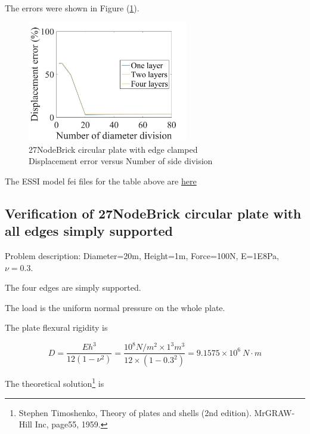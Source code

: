 \documentclass[fleqn,11pt,letter]{article}
\begin{document}
The errors were shown in Figure (\ref{fig 27NodeBrick circular plate with edge clamped}).
\begin{figure}[H]
  \centering
  \includegraphics[width=7cm]{../Figure_files/27NodeBrick/error27brick_circular_plate_clamped100.jpeg}
  \captionsetup{justification=centering,margin=3cm}
  \caption{27NodeBrick circular plate with edge clamped\\
      Displacement error   versus   Number of side division}
  \label{fig 27NodeBrick circular plate with edge clamped}
\end{figure}



The ESSI model fei files for the table above are \href{https://github.com/yuan-energy/ESSI_Verification/blob/master/27NodeBrick/circular_plate_clamped/circular_plate_clamped.tar.gz?raw=true}{here}






\newpage
\subsection{Verification of 27NodeBrick circular plate with all edges simply supported}


Problem description: Diameter=20m, Height=1m, Force=100N, E=1E8Pa, $\nu=0.3$. 

The four edges are simply supported. 

The load is the uniform normal pressure on the whole plate. 


The plate flexural rigidity is 

\begin{equation}
  D=\frac{Eh^3}{12(1-\nu^2)}=\frac{10^8 N/m^2 \times 1^3 m^3 }{12 \times (1-0.3^2) }= 9.1575 \times 10^6 \ N\cdot m
\end{equation}

The theoretical solution\footnote{Stephen Timoshenko, Theory of plates and shells (2nd edition). MrGRAW-Hill Inc, page55, 1959.} is 
\end{document}

